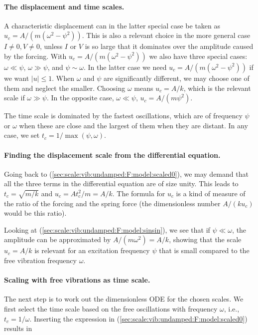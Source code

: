 \documentclass[graybox,envcountchap,sectrefs,final]{svmonodo}
\begin{document}
\paragraph{The displacement and time scales.}
A characteristic displacement can in the latter special case
be taken as $u_c= A/(m(\omega^2 - \psi^2))$. This is also a relevant choice
in the more general case $I\neq0, V\neq 0$, unless $I$ or $V$
is so large that it dominates over the amplitude
caused by the forcing. With $u_c= A/(m(\omega^2 - \psi^2))$ we also
have three special cases: $\omega \ll \psi$, $\omega \gg\psi$, and
$\psi \sim \omega$. In the latter case we need
$u_c= A/(m(\omega^2 - \psi^2))$ if we want $|u|\leq 1$. When
$\omega$ and $\psi$ are significantly different, we may choose one
of them and neglect the smaller. Choosing $\omega$ means $u_c=A/k$,
which is the relevant scale
if $\omega\gg\psi$. In the opposite case, $\omega\ll\psi$,
$u_c=A/(m\psi^2)$.

The time scale is dominated by the fastest oscillations, which are
of frequency $\psi$ or $\omega$ when these are close and the largest
of them when they are distant. In any case, we set
$t_c=1/\max(\psi,\omega)$.

\paragraph{Finding the displacement scale from the differential equation.}
Going back to (\ref{sec:scale:vib:undamped:F:model:scaled0}), we
may demand that all the three terms in the differential equation
are of size unity. This leads to $t_c=\sqrt{m/k}$
and $u_c=At_c^2/m = A/k$. The formula for $u_c$ is a kind of measure
of the ratio of the
forcing and the spring force (the dimensionless number
$A/(ku_c)$ would be this ratio).

Looking at (\ref{sec:scale:vib:undamped:F:model:sinsin}), we see
that if $\psi\ll\omega$, the amplitude can be approximated
by $A/(m\omega^2)=A/k$, showing that the scale $u_c=A/k$ is
relevant for an excitation frequency $\psi$ that is small compared to
the free vibration frequency $\omega$.

\paragraph{Scaling with free vibrations as time scale.}
The next step is to work out the dimensionless ODE for the chosen scales.
We first select the time scale based on the free oscillations
with frequency $\omega$, i.e., $t_c=1/\omega$. Inserting the expression in
(\ref{sec:scale:vib:undamped:F:model:scaled0}) results in
\end{document}

